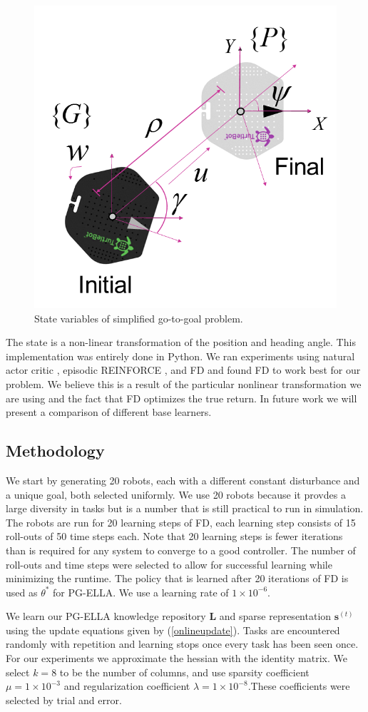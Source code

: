 \documentclass{aamas2016}
\begin{document}
\begin{figure}[!htbp]
    \centering
        \includegraphics[width=.45\textwidth]{images/unicycle.png}
        \caption{State variables of simplified go-to-goal problem.}\label{fig:numfeat}
\end{figure}
The state is a non-linear transformation of the position and heading angle. This implementation was entirely done in Python. We ran experiments using natural actor critic \cite{peters2008natural}, episodic REINFORCE \cite{williams1992simple}, and FD \cite{Bagnell-2013} and found FD to work best for our problem. We believe this is a result of the particular nonlinear transformation we are using and the fact that FD optimizes the true return. In future work we will present a comparison of different base learners. 

\subsection{Methodology}
We start by generating 20 robots, each with a different constant disturbance and a unique goal, both selected uniformly. We use 20 robots because it provdes a large diversity in tasks but is a number that is still practical to run in simulation. The robots are run for 20 learning steps of FD, each learning step consists of 15 roll-outs of 50 time steps each. Note that 20 learning steps is fewer iterations than is required for any system to converge to a good controller. The number of roll-outs and time steps were selected to allow for successful learning while minimizing the runtime. The policy that is learned after 20 iterations of FD is used as $\theta^*$ for PG-ELLA. We use a learning rate of $1\times 10^{-6}$. 

We learn our PG-ELLA knowledge repository $\bm{L}$ and sparse representation $\bm{s}^{(t)}$ using the update equations given 
by (\ref{onlineupdate}). Tasks are encountered randomly with repetition and learning stops once every task has been seen 
once. For our experiments we approximate the hessian with the identity matrix. We select $k=8$ to be the number of columns, and use sparsity coefficient $\mu = 1\times 10^{-3}$ and regularization coefficient $\lambda = 1\times 10^{-8}$.These coefficients were selected by trial and error. 
\end{document}
